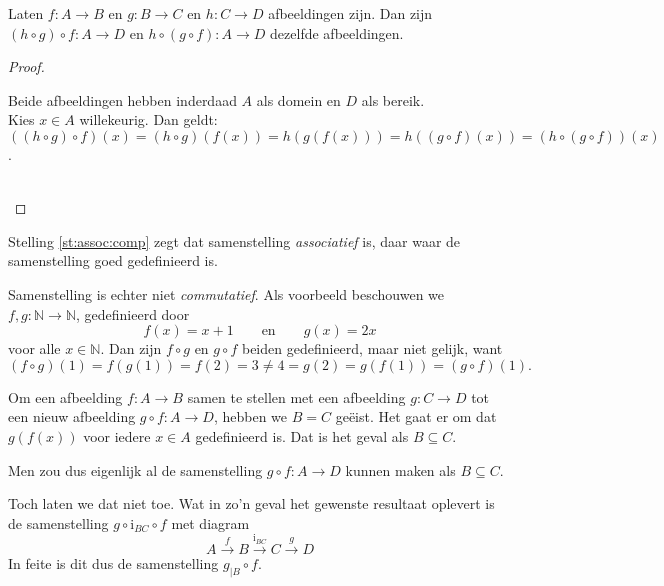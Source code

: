 \begin{theorem}\label{st:assoc:comp}
Laten $f:A\rightarrow B$ en $g:B\rightarrow C$ en $h:C\rightarrow D$ afbeeldingen zijn. Dan zijn $(h\circ g)\circ f: A\rightarrow D$ en $h\circ(g\circ f):A\rightarrow D$ dezelfde afbeeldingen.
\end{theorem}
\begin{proof}\mbox{}\\
\indent\begin{minipage}{0.9\textwidth}
Beide afbeeldingen hebben inderdaad $A$ als domein en $D$ als bereik.\\[1.5pt]
Kies $x\in A$ willekeurig. Dan geldt:\\[1.5pt]
$((h\circ g)\circ f)(x)=(h\circ g)(f(x))=h(g(f(x)))=h((g\circ f)(x))=(h\circ(g\circ f))(x)$.
\end{minipage}\\
\end{proof}

Stelling \ref{st:assoc:comp} zegt dat samenstelling \textit{associatief} is, daar waar de samenstelling goed gedefinieerd is.

Samenstelling is echter niet \textit{commutatief}. Als voorbeeld beschouwen we $f, g:\mathbb{N}\rightarrow\mathbb{N}$, gedefinieerd door
    $$f(x)=x+1\qquad\text{en}\qquad g(x)=2x$$
voor alle $x\in\mathbb{N}$. Dan zijn $f\circ g$ en $g\circ f$ beiden gedefinieerd, maar niet gelijk, want
$$(f\circ g)(1)=f(g(1))=f(2)=3\not=4=g(2)=g(f(1))=(g\circ f)(1).$$

Om een afbeelding $f:A\rightarrow B$ samen te stellen met een afbeelding $g:C\rightarrow D$ tot een nieuw afbeelding $g\circ f:A\rightarrow D$, hebben we $B=C$ ge\"eist. Het gaat er om dat $g(f(x))$ voor iedere $x\in A$ gedefinieerd is. Dat is het geval als $B\subseteq C$.

Men zou dus eigenlijk al de samenstelling $g\circ f: A\rightarrow D$ kunnen maken als $B\subseteq C$.

Toch laten we dat niet toe. Wat in zo'n geval het gewenste resultaat oplevert is de samenstelling $g\circ\text{i}_{BC}\circ f$ met diagram
$$A\overset{f}{\rightarrow}B\overset{\text{i}_{BC}}{\rightarrow}C\overset{g}{\rightarrow}D$$
In feite is dit dus de samenstelling $g_{|B}\circ f$.

